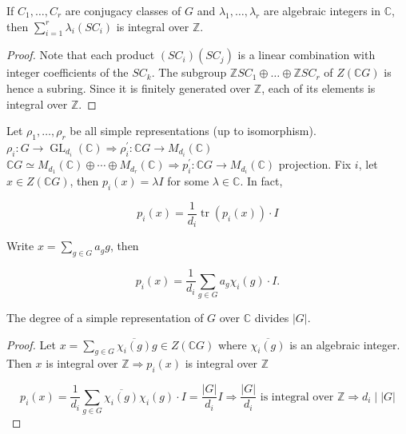 \documentclass[11pt, a4paper]{report}
\begin{document}
\begin{proposition}
If $C_{1}, \ldots, C_{r}$ are conjugacy classes of $G$ and $\lambda_{1}, \ldots, \lambda_{r}$ are algebraic integers in $\mathbb{C}$, then $\sum_{i=1}^{r} \lambda_{i}(SC_{i})$ is integral over $\mathbb{Z}$.
\end{proposition}

\begin{proof}
Note that each product $(SC_{i})(SC_{j})$ is a linear combination with integer coefficients of the $SC_{k}$. The subgroup $\mathbb{Z} SC_{1} \oplus \ldots \oplus \mathbb{Z} SC_{r}$ of $Z(\mathbb{C}G)$ is hence a subring. Since it is finitely generated over $\mathbb{Z}$, each of its elements is integral over $\mathbb{Z}$.

\end{proof}

\begin{lemma}

Let $\rho_{1}, \ldots, \rho_{r}$ be all simple representations (up to isomorphism). $\rho_{i}: G \rightarrow \operatorname{GL}_{d_{i}}(\mathbb{C}) \Rightarrow \rho_{i}^{\prime}: \mathbb{C} G \rightarrow M_{d_{i}}(\mathbb{C})$
$\mathbb{C} G \simeq M_{d_{1}}(\mathbb{C}) \oplus \cdots \oplus M_{d_{r}}(\mathbb{C}) \Rightarrow p_{i}^{\prime}: \mathbb{C} G \rightarrow M_{d_{i}}(\mathbb{C})$ projection.
Fix $i$, let $x \in Z(\mathbb{C}G)$, then $p_{i}(x)=\lambda I$ for some $\lambda \in \mathbb{C}$. In fact,

\[
p_{i}(x)=\frac{1}{d_{i}} \operatorname{tr}\left(p_{i}(x)\right) \cdot I
\]

Write $x=\sum_{g \in G} a_{g} g$, then

\[
p_{i}(x)=\frac{1}{d_{i}} \sum_{g \in G} a_{g} \chi_{i}(g) \cdot I .
\]

\end{lemma}

\begin{theorem}
The degree of a simple representation of $G$ over $\mathbb{C}$ divides $|G|$.

\end{theorem}

\begin{proof}
Let $x=\sum_{g \in G} \overline{\chi_{i}(g)} g \in Z(\mathbb{C}G)$ where $\overline{\chi_{i}(g)}$ is an algebraic integer.
Then $x$ is integral over $\mathbb{Z} \Rightarrow p_{i}(x)$ is integral over $\mathbb{Z}$

\[
p_{i}(x)=\frac{1}{d_{i}} \sum_{g \in G} \overline{\chi_{i}(g)} \chi_{i}(g) \cdot I=\frac{|G|}{d_{i}} I \Rightarrow \frac{|G|}{d_{i}} \text{ is integral over } \mathbb{Z} \Rightarrow d_{i} \mid |G|
\]

\end{proof}
\end{document}
